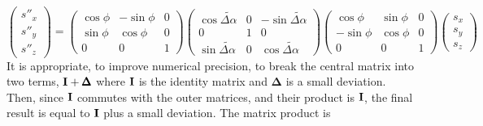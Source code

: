 \documentclass[]{article}
\begin{document}
\begin{equation}
\begin{pmatrix} s''_x \\ s''_y \\ s''_z \end{pmatrix}
 =
\begin{pmatrix} 
  \cos\phi  & -\sin\phi &  0 \\
  \sin\phi  &  \cos\phi &  0 \\
    0       &     0     &  1
\end{pmatrix}
\begin{pmatrix} 
 \cos\widetilde{\Delta\alpha}  &  0  & -\sin\widetilde{\Delta\alpha}  \\
           0                   &  1  &              0                 \\
 \sin\widetilde{\Delta\alpha}  &  0  &  \cos\widetilde{\Delta\alpha}  
\end{pmatrix}
\begin{pmatrix} 
  \cos\phi &  \sin\phi  &  0 \\
 -\sin\phi &  \cos\phi  &  0 \\
    0      &     0      &  1
\end{pmatrix}
\begin{pmatrix} s_x \\ s_y \\ s_z \end{pmatrix}
\label{eq:ThinEl.4}
\end{equation}
%
It is appropriate, to improve numerical precision, to 
break the central matrix into two terms, ${\bf I}+{\pmb\Delta}$
where ${\bf I}$ is the identity matrix and ${\pmb\Delta}$ is a
small deviation. Then, since ${\bf I}$ commutes with the outer
matrices, and their product is ${\bf I}$, the final result is
equal to ${\bf I}$ plus a small deviation. The matrix product is
%
\end{document}

